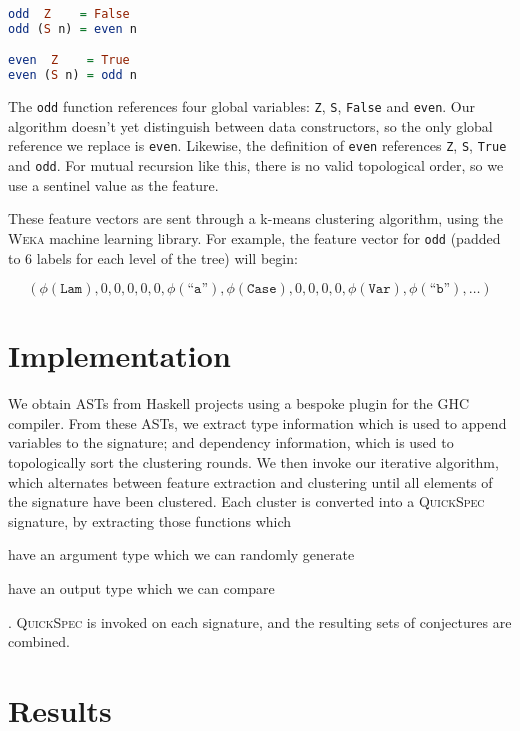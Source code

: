 \documentclass[]{default}
\newcommand{\feature}[1]{\phi(#1)}
\newcommand{\id}[1]{\texttt{``#1''}}
\newcommand{\CVar}{\texttt{Var}}
\newcommand{\CLam}{\texttt{Lam}}
\newcommand{\CCase}{\texttt{Case}}
\begin{document}
\begin{lstlisting}[language=Haskell]
odd  Z    = False
odd (S n) = even n

even  Z    = True
even (S n) = odd n
\end{lstlisting}

The \texttt{odd} function references four global variables: \texttt{Z}, \texttt{S}, \texttt{False} and \texttt{even}. Our algorithm doesn't yet distinguish between data constructors, so the only global reference we replace is \texttt{even}. Likewise, the definition of \texttt{even} references \texttt{Z}, \texttt{S}, \texttt{True} and \texttt{odd}. For mutual recursion like this, there is no valid topological order, so we use a sentinel value as the feature.

These feature vectors are sent through a k-means clustering algorithm, using the \textsc{Weka} machine learning library. For example, the feature vector for \texttt{odd} (padded to 6 labels for each level of the tree) will begin:

\begin{equation*}
  (\feature{\CLam}, 0, 0, 0, 0, 0, \feature{\id{a}}, \feature{\CCase}, 0, 0, 0, 0, \feature{\CVar}, \feature{\id{b}}, \dots )
\end{equation*}

\section{Implementation}\label{implementation}

We obtain ASTs from Haskell projects using a bespoke plugin for the GHC
compiler. From these ASTs, we extract type information which is used to append variables to the signature; and dependency information, which is used to topologically sort the clustering rounds. We then invoke our iterative algorithm, which alternates between feature extraction and clustering until all elements of the signature have been clustered. Each cluster is converted into a \textsc{QuickSpec} signature, by extracting those functions which
\begin{inlinelist}
\item have an argument type which we can randomly generate
\item have an output type which we can compare
\end{inlinelist}. \textsc{QuickSpec} is invoked on each signature, and the resulting sets of conjectures are combined.

\section{Results}\label{results}
\end{document}
